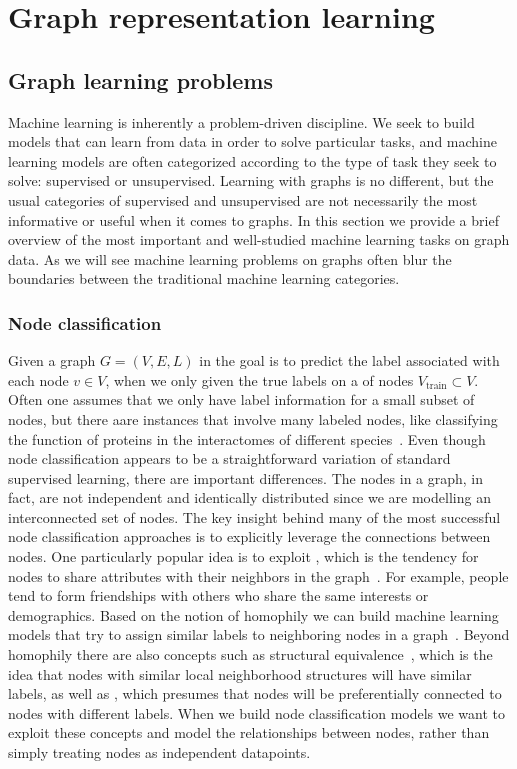 \chapter{Graph representation learning}\label{grl}

\section{Graph learning problems}
Machine learning is inherently a problem-driven discipline. We seek to build models that can learn from data in order to solve particular tasks, and machine learning models are often categorized according to the type of task they seek to solve: supervised or unsupervised. Learning with graphs is no different, but the usual categories of supervised and unsupervised are not necessarily the most informative or useful when it comes to graphs. In this section we provide a brief overview of the most important and well-studied machine learning tasks on graph data. As we will see machine learning problems on graphs often blur the boundaries between the traditional machine learning categories.

\subsection{Node classification}
Given a graph $G=(V,E,L)$ in  the goal is to predict the label associated with each node $v\in V$, when we only given the true labels on a  of nodes $V_\text{train}\subset V$. Often one assumes that we only have label information for a small subset of nodes, but there aare instances that involve many labeled nodes, like classifying the function of proteins in the interactomes of different species~\cite{Hamilton2017inductive}.
Even though node classification appears to be a straightforward variation of standard supervised learning, there are important differences. The nodes in a graph, in fact, are not independent and identically distributed since we are modelling an interconnected set of nodes. The key insight behind many of the most successful node classification approaches is to explicitly leverage the connections between nodes. One particularly popular idea is to exploit , which is the tendency for nodes to share attributes with their neighbors in the graph~\cite{Mcpherson2001homophilyInSocialNw}. For example, people tend to form friendships with others who share the same interests or demographics. Based on the notion of homophily we can build machine learning models that try to assign similar labels to neighboring nodes in a graph~\cite{Zhou2003LearningLocalGlobalConsistency}. Beyond homophily there are also concepts such as structural equivalence~\cite{Donnat2017GraphWaveletsStructuralRoleSimilarityComplexNws}, which is the idea that nodes with similar local neighborhood structures will have similar labels, as well as , which presumes that nodes will be preferentially connected to nodes with different labels. When we build node classification models we want to exploit these concepts and model the relationships between nodes, rather than simply treating nodes as independent datapoints.

